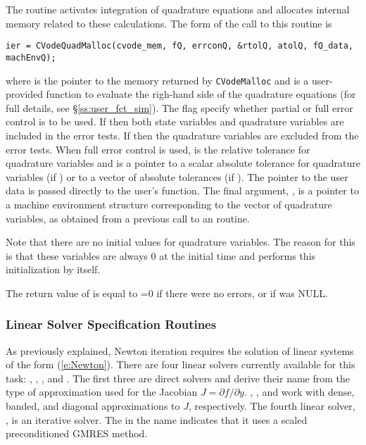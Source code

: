 The routine  activates integration of quadrature equations 
and allocates internal memory related to these calculations.
The form of the call to this routine is
\begin{verbatim}
ier = CVodeQuadMalloc(cvode_mem, fQ, errconQ, &rtolQ, atolQ, fQ_data, machEnvQ);  
\end{verbatim}
where  is the pointer to the {\cvodes} memory returned by {\tt CVodeMalloc}
and  is a user-provided {\C} function to evaluate the righ-hand side of the
quadrature equations (for full details, see \S\ref{ss:user_fct_sim}). 
The flag  specify whether partial or full error 
control is to be used. If  then both state variables and
quadrature variables are included in the error tests. 
If  then the quadrature variables are excluded from the 
error tests. When full error control is used,  is the relative tolerance for
quadrature variables and  is a pointer to a scalar absolute tolerance for
quadrature variables (if ) or to a vector of absolute tolerances 
(if ). The pointer to the user data  is passed
directly to the user's  function. The final argument, ,
is a pointer to a machine environment structure corresponding to the
vector of quadrature variables, as obtained from a previous call to an
 routine.

Note that there are no initial values for quadrature variables. The reason for this is 
that these variables are always $0$ at the initial time and {\cvodes} performs this
initialization by itself.

The return value  of  is equal to =0 if
there were no errors, or  if  was NULL.  

\subsubsection{Linear Solver Specification Routines}\label{sss:lin_solv_init}

As previously explained, Newton iteration requires the solution of
linear systems of the form (\ref{e:Newton}).  There are four {\cvodes} linear
solvers currently available for this task: {\cvdense}, {\cvband}, {\cvdiag},
and {\cvspgmr}.  The first three are direct solvers and derive their name
from the type of approximation used for the Jacobian 
$J = \partial{f}/\partial{y}$.  {\cvdense}, {\cvband}, and {\cvdiag} work with
dense, banded, and diagonal approximations to $J$, respectively.  The
fourth {\cvodes} linear solver, {\cvspgmr}, is an iterative solver.  The {\spgmr}
in the name indicates that it uses a scaled preconditioned
GMRES method.


